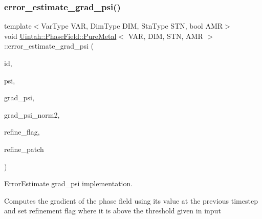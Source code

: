 \subsubsection{\texorpdfstring{error\+\_\+estimate\+\_\+grad\+\_\+psi()}{error\_estimate\_grad\_psi()}}
{\footnotesize\ttfamily template$<$Var\+Type V\+AR, Dim\+Type D\+IM, Stn\+Type S\+TN, bool A\+MR$>$ \\
void \hyperlink{classUintah_1_1PhaseField_1_1PureMetal}{Uintah\+::\+Phase\+Field\+::\+Pure\+Metal}$<$ V\+AR, D\+IM, S\+TN, A\+MR $>$\+::error\+\_\+estimate\+\_\+grad\+\_\+psi (\begin{DoxyParamCaption}\item[{const Int\+Vector \&}]{id,  }\item[{\hyperlink{namespaceUintah_1_1PhaseField_a63032464b1cd54eaa53c1c29109746ac}{F\+D\+View}$<$ \hyperlink{structUintah_1_1PhaseField_1_1ScalarField}{Scalar\+Field}$<$ const double $>$, S\+TN $>$ \&}]{psi,  }\item[{\hyperlink{namespaceUintah_1_1PhaseField_a59210a1e28eba254d428762c92ddeabb}{View}$<$ \hyperlink{structUintah_1_1PhaseField_1_1VectorField}{Vector\+Field}$<$ double, D\+IM $>$ $>$ \&}]{grad\+\_\+psi,  }\item[{\hyperlink{namespaceUintah_1_1PhaseField_a59210a1e28eba254d428762c92ddeabb}{View}$<$ \hyperlink{structUintah_1_1PhaseField_1_1ScalarField}{Scalar\+Field}$<$ double $>$ $>$ \&}]{grad\+\_\+psi\+\_\+norm2,  }\item[{\hyperlink{namespaceUintah_1_1PhaseField_a59210a1e28eba254d428762c92ddeabb}{View}$<$ \hyperlink{structUintah_1_1PhaseField_1_1ScalarField}{Scalar\+Field}$<$ int $>$ $>$ \&}]{refine\+\_\+flag,  }\item[{bool \&}]{refine\+\_\+patch }\end{DoxyParamCaption})\hspace{0.3cm}{\ttfamily [protected]}}



Error\+Estimate grad\+\_\+psi implementation. 

Computes the gradient of the phase field using its value at the previous timestep and set refinement flag where it is above the threshold given in input


